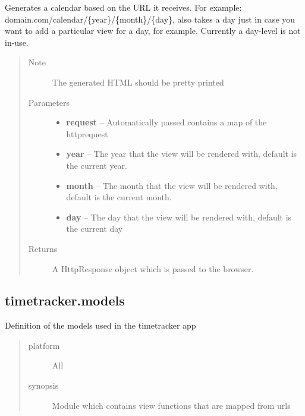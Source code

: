 \documentclass[letterpaper,10pt,english]{sphinxmanual}
\begin{document}

\begin{fulllineitems}
\label{code:timetracker.views.user_view}
Generates a calendar based on the URL it receives.
For example: domain.com/calendar/\{year\}/\{month\}/\{day\},
also takes a day just in case you want to add a particular
view for a day, for example. Currently a day-level is not
in-use.
\begin{quote}\begin{description}
\item[{Note }] \leavevmode
The generated HTML should be pretty printed

\item[{Parameters}] \leavevmode\begin{itemize}
\item {} 
\textbf{request} -- Automatically passed contains a map of the httprequest

\item {} 
\textbf{year} -- The year that the view will be rendered with, default is
the current year.

\item {} 
\textbf{month} -- The month that the view will be rendered with, default is
the current month.

\item {} 
\textbf{day} -- The day that the view will be rendered with, default is
the current day

\end{itemize}

\item[{Returns}] \leavevmode
A HttpResponse object which is passed to the browser.

\end{description}\end{quote}

\end{fulllineitems}



\subsection{timetracker.models}
\label{code:module-timetracker.tracker.models}\label{code:timetracker-models}
Definition of the models used in the timetracker app
\begin{quote}\begin{description}
\item[{platform}] \leavevmode
All

\item[{synopsis}] \leavevmode
Module which contains view functions that are mapped from urls

\end{description}\end{quote}
\end{document}
